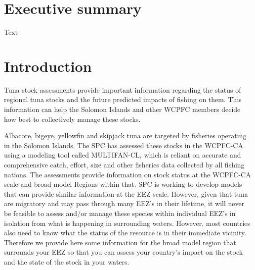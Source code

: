 \documentclass[
]{article}
\author{}
\date{\vspace{-2.5em}}
\begin{document}
\newcommand*{\BaseDir}{P:/OFPSAM/Cty_status_reports/ISNRs/Country_TFAR/2023/Report_template}
\newcommand*{\FigDir}{P:/OFPSAM/TFAR/T_FAR_2022/figs/}


\hspace{1cm}

\newpage

\hypertarget{executive-summary}{%
\section{Executive summary}\label{executive-summary}}

Text

\clearpage

\hypertarget{introduction}{%
\section{Introduction}\label{introduction}}

Tuna stock assessments provide important information regarding the
status of regional tuna stocks and the future predicted impacts of
fishing on them. This information can help the Solomon Islands and other
WCPFC members decide how best to collectively manage these stocks.

Albacore, bigeye, yellowfin and skipjack tuna are targeted by fisheries
operating in the Solomon Islands. The SPC has assessed these stocks in
the WCPFC-CA using a modeling tool called MULTIFAN-CL, which is reliant
on accurate and comprehensive catch, effort, size and other fisheries
data collected by all fishing nations. The assessments provide
information on stock status at the WCPFC-CA scale and broad model
Regions within that. SPC is working to develop models that can provide
similar information at the EEZ scale. However, given that tuna are
migratory and may pass through many EEZ's in their lifetime, it will
never be feasible to assess and/or manage these species within
individual EEZ's in isolation from what is happening in surrounding
waters. However, most countries also need to know what the status of the
resource is in their immediate vicinity. Therefore we provide here some
information for the broad model region that surrounds your EEZ so that
you can assess your country's impact on the stock and the state of the
stock in your waters.
\end{document}
